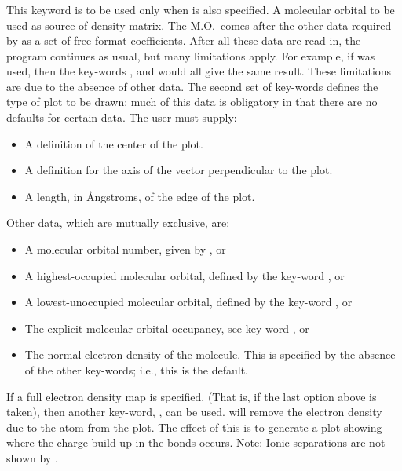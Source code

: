 \subsubsection*{}
This keyword is to be used only when  is also specified. A
molecular orbital to be used as source of density matrix.  The M.O.\ comes
after the other data required by  as a set of free-format
coefficients. After all these data are read in, the program continues as usual,
but many limitations apply. For example, if  was used, then the
key-words  ,  and  would all give the same
result. These limitations are due to the absence of other data. The second set
of key-words defines the type of plot to be drawn; much of this data is
obligatory in that there are no defaults for certain data. The user must
supply:
\begin{itemize}
\item A definition of the center of the plot.
\item A definition for the axis of the vector perpendicular to the plot.
\item A length, in \AA ngstroms, of the edge of the plot.
\end{itemize}
Other data, which are mutually exclusive, are:
\begin{itemize}
\item A molecular orbital number, given by , or
\item A highest-occupied molecular orbital, defined by the key-word
 , or
\item A lowest-unoccupied molecular orbital, defined by the
key-word , or
\item The explicit molecular-orbital occupancy, see key-word , or
\item The normal electron density of the molecule. This is specified by
the absence of the other key-words; i.e., this is the default.
\end{itemize}
If a full electron density map is specified. (That is, if the last option
above is taken), then another key-word, , can be used. 
will remove the electron density due to the atom from the plot. The effect of
this is to  generate a plot showing where the charge build-up in the bonds
occurs. Note: Ionic separations are not shown by .

